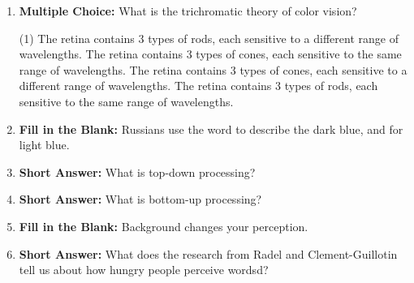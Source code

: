 \begin{enumerate}[label=\textbf{Q2.9.\arabic*}]
      \item \textbf{Multiple Choice:} What is the trichromatic theory of color vision?
            \begin{tasks}[label=\textcolor{\documentTheme}{(\Alph*)}, item-format=\color{\documentTheme}, label-width=1.5em, item-indent=1.7em](1)
                  \task The retina contains 3 types of rods, each sensitive to a different range of wavelengths.
                  \task The retina contains 3 types of cones, each sensitive to the same range of wavelengths.
                  \task The retina contains 3 types of cones, each sensitive to a different range of wavelengths.
                  \task The retina contains 3 types of rods, each sensitive to the same range of wavelengths.
            \end{tasks}

      \item \textbf{Fill in the Blank:} Russians use the word \underline{\hspace{3cm}} to describe the dark blue, and \underline{\hspace{3cm}} for light blue. \\
      

      \item \textbf{Short Answer:} What is top-down processing? \\

      \item \textbf{Short Answer:} What is bottom-up processing? \\

      \item \textbf{Fill in the Blank:} Background changes your \underline{\hspace{3cm}} perception. \\

      \item \textbf{Short Answer:} What does the research from Radel and Clement-Guillotin tell us about how hungry people perceive wordsd? \\

\end{enumerate}